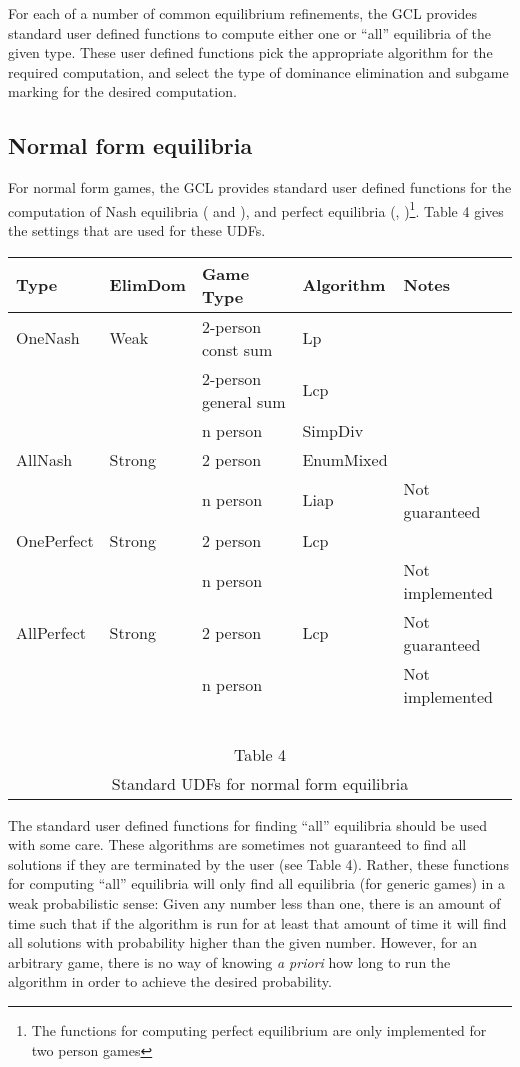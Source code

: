 For each of a number of common equilibrium refinements, the GCL
provides standard user defined functions to compute either one or ``all''
equilibria of the given type.  These user defined functions pick the
appropriate algorithm for the required computation, and select the
type of dominance elimination and subgame marking for the desired
computation.

\subsection{Normal form equilibria}

For normal form games, the GCL provides standard user defined
functions for the computation of Nash equilibria ( and ), and perfect
equilibria (, )\footnote{The
functions for computing perfect equilibrium are only implemented for
two person games}.  Table 4 gives the settings that are used for these
UDFs.
\medskip

\begin{tabular}{|l|l|p{2cm}|l|l|}
Type & ElimDom & Game Type & Algorithm & Notes \\
\hline
OneNash & Weak & 2-person const sum & Lp & \\ \cline{3-5}
        &      & 2-person general  sum & Lcp& \\ \cline{3-5}
        &      & n person              & SimpDiv & \\
\hline
AllNash & Strong & 2 person       & EnumMixed &  \\ \cline{3-5}
        &        & n person       & Liap      & Not guaranteed\\
\hline
\hline
OnePerfect & Strong & 2 person     & Lcp    & \\ \cline{3-5}
           &        & n person     &     &Not implemented  \\
\hline
AllPerfect & Strong & 2 person      & Lcp & Not guaranteed \\ \cline{3-5}
           &        & n person      &     & Not implemented\\
\hline
\multicolumn{5}{c}{\ }\\
\multicolumn{5}{c}{Table 4}\\
\multicolumn{5}{c}{Standard UDFs for normal form equilibria}\\
\end{tabular}
\medskip

The standard user defined functions for finding ``all'' equilibria
should be used with some care.  These algorithms are sometimes not
guaranteed to find all solutions if they are terminated by the user
(see Table 4).  Rather, these functions for computing ``all''
equilibria will only find all equilibria (for generic games) in a weak
probabilistic sense: Given any number less than one, there is an
amount of time such that if the algorithm is run for at least that amount of
time it will find all solutions with probability higher than the given
number.  However, for an arbitrary game, there is no way of knowing
{\it a priori} how long to run the algorithm in order to achieve the
desired probability.  

